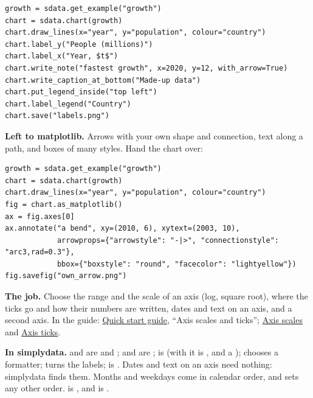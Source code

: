 \begin{lstlisting}[style=py]
growth = sdata.get_example("growth")
chart = sdata.chart(growth)
chart.draw_lines(x="year", y="population", colour="country")
chart.label_y("People (millions)")
chart.label_x("Year, $t$")
chart.write_note("fastest growth", x=2020, y=12, with_arrow=True)
chart.write_caption_at_bottom("Made-up data")
chart.put_legend_inside("top left")
chart.label_legend("Country")
chart.save("labels.png")
\end{lstlisting}

\textbf{Left to matplotlib.} Arrows with your own shape and connection, text along a path, and
boxes of many styles. Hand the chart over:

\begin{lstlisting}[style=py]
growth = sdata.get_example("growth")
chart = sdata.chart(growth)
chart.draw_lines(x="year", y="population", colour="country")
fig = chart.as_matplotlib()
ax = fig.axes[0]
ax.annotate("a bend", xy=(2010, 6), xytext=(2003, 10),
            arrowprops={"arrowstyle": "-|>", "connectionstyle": "arc3,rad=0.3"},
            bbox={"boxstyle": "round", "facecolor": "lightyellow"})
fig.savefig("own_arrow.png")
\end{lstlisting}


\textbf{The job.} Choose the range and the scale of an axis (log, square root), where the ticks go and
how their numbers are written, dates and text on an axis, and a second axis. In the guide:
\href{https://matplotlib.org/stable/users/explain/quick_start.html}{Quick start guide}, ``Axis
scales and ticks'';
\href{https://matplotlib.org/stable/users/explain/axes/axes_scales.html}{Axis scales} and
\href{https://matplotlib.org/stable/users/explain/axes/axes_ticks.html}{Axis ticks}.

\textbf{In simplydata.}  and  are  and
;  and  are
;  is  (with  it is
, and  a ); 
chooses a formatter;  turns the labels;  is
. Dates and text on an axis need nothing: simplydata finds them. Months and
weekdays come in calendar order, and  sets any other order.  is
, and  is .

